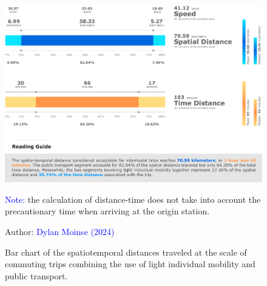 \begin{refsegment}
\begin{figure}[h!]\vspace*{4pt}
    \caption{Bar chart of the spatiotemporal distances traveled at the scale of commuting trips combining the use of light individual mobility and public transport.}
    \label{fig-chap5:distances-globales}
    \centerline{\includegraphics[width=1\columnwidth]{src/Figures/Chap-5/EN_Distances_Globales.pdf}}
    \vspace{5pt}
    \begin{flushleft}\scriptsize{
    \textcolor{blue}{Note:} the calculation of distance-time does not take into account the precautionary time when arriving at the origin station.
    }\end{flushleft}
    \begin{flushright}\scriptsize{
    Author: \textcolor{blue}{Dylan Moinse (2024)}
    }\end{flushright}
\end{figure}


\end{refsegment}
